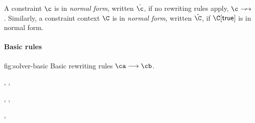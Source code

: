 \documentclass[acmsmall,screen,nonacm%
\Anonymous{,anonymous}{}%
\Final{}{,review}%
]{acmart}
\begin{document}
\begin{definition}
  \label{def/normal-forms}
  A constraint $\c$ is in \emph{normal form}, written $\hat\c$, if no 
  rewriting rules apply, \ie $\c \cnsolve$. Similarly, a constraint context 
  $\C$ is in \emph{normal form}, written $\hat\C$, if $\C\where\ctrue$ is in
  normal form. 
\end{definition}


\paragraph{Basic rules}

\begin{mathparfig}[tp]
  {fig:solver-basic}
  {Basic rewriting rules $\ca \csolve \cb$.}
  \rewrite[S-Unif]
    {\upa}
    {\upa \unif \upb}
    {\upb}

  \rewrite[S-False]
    {\C\where\cfalse}
    {\C \neq \hole}
    {\cfalse}

  \rewrite[S-Let]
    {\clet \x \tv \ca \cb}
    {}
    {\cletr \x \tv \eset \ca \cb}

    {\tv \disjoint \cb}
    {\cexists \tv {\ca \cand \cb}}

    {\tvb \disjoint \tv, \tvs, \cb}
    {\cletr \x \tv {\tvs, \tvb} \ca \cb}

    {\tvb \disjoint \tv, \tvs, \ca}
    {\cexists \tvb {\cletr \x \tv \tvs \ca \cb}}

    {\ca \disjoint \tv, \tvs}
    {\ca \cand \cletr \x \tv \tvs \cb \cc}

    {\x \disjoint \cb}
    {\cb \cand \cletr \x \tv \tvs \ca \cc}
\end{mathparfig}


\end{document}
